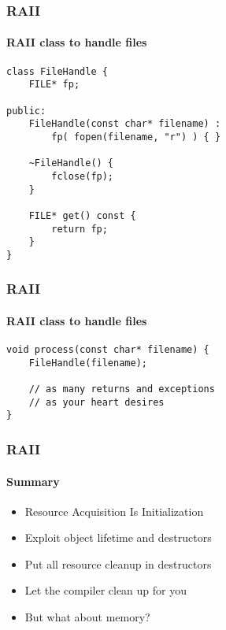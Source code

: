 \begin{frame}[fragile]
    \frametitle{RAII}
    \framesubtitle{RAII class to handle files}
    \begin{lstlisting}[title=Problems begone!]
class FileHandle {
    FILE* fp;

public:
    FileHandle(const char* filename) :
        fp( fopen(filename, "r") ) { }

    ~FileHandle() {
        fclose(fp);
    }

    FILE* get() const {
        return fp;
    }
}
    \end{lstlisting}
\end{frame}

\begin{frame}[fragile]
    \frametitle{RAII}
    \framesubtitle{RAII class to handle files}
    \begin{lstlisting}[title=Problems begone!]
void process(const char* filename) {
    FileHandle(filename);

    // as many returns and exceptions
    // as your heart desires
}
    \end{lstlisting}
\end{frame}

\begin{frame}
    \frametitle{RAII}
    \framesubtitle{Summary}
    \begin{itemize}
        \item<1->Resource Acquisition Is Initialization 
        \item<1->Exploit object lifetime and destructors
        \item<1->Put all resource cleanup in destructors
        \item<1->Let the compiler clean up for you
        \item<2->But what about memory?
    \end{itemize}
\end{frame}



